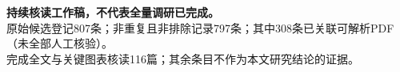 \textbf{持续核读工作稿，不代表全量调研已完成。}\\[5pt]
原始候选登记807条；非重复且非排除记录797条；其中308条已关联可解析PDF（未全部人工核验）。\\[5pt]
完成全文与关键图表核读116篇；其余条目不作为本文研究结论的证据。
